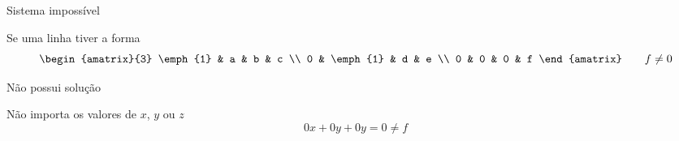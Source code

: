 \begin{question}
  Sistema impossível

  Se uma linha tiver a forma
  \[
    \begin{amatrix}{3}
      \emph{1} & a        & b & c \\
      0        & \emph{1} & d & e \\
      0        & 0        & 0 & f
    \end{amatrix}
    \qquad f \neq 0
  \]

  \pause
  Não possui solução

  \pause
  Não importa os valores de $x$, $y$ ou $z$
  \[
    0x + 0y + 0y = 0 \neq f
  \]
\end{question}

